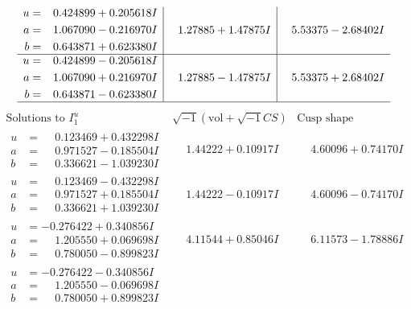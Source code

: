 \documentclass[1p]{elsarticle_modified}
\theoremstyle{definition}
\newcommand{\I}{\sqrt{-1}}
\begin{document}
$$\begin{array}{c|c|c}
\begin{aligned}
u &= \phantom{-}0.424899 + 0.205618 I \\
a &= \phantom{-}1.067090 - 0.216970 I \\
b &= \phantom{-}0.643871 + 0.623380 I\end{aligned}
 & \phantom{-}1.27885 + 1.47875 I & \phantom{-}5.53375 - 2.68402 I \\ \hline\begin{aligned}
u &= \phantom{-}0.424899 - 0.205618 I \\
a &= \phantom{-}1.067090 + 0.216970 I \\
b &= \phantom{-}0.643871 - 0.623380 I\end{aligned}
 & \phantom{-}1.27885 - 1.47875 I & \phantom{-}5.53375 + 2.68402 I\\
 \hline 
 \end{array}$$\newpage$$\begin{array}{c|c|c}  
\text{Solutions to }I^u_{1}& \I (\text{vol} + \sqrt{-1}CS) & \text{Cusp shape}\\
 \hline 
\begin{aligned}
u &= \phantom{-}0.123469 + 0.432298 I \\
a &= \phantom{-}0.971527 - 0.185504 I \\
b &= \phantom{-}0.336621 - 1.039230 I\end{aligned}
 & \phantom{-}1.44222 + 0.10917 I & \phantom{-}4.60096 + 0.74170 I \\ \hline\begin{aligned}
u &= \phantom{-}0.123469 - 0.432298 I \\
a &= \phantom{-}0.971527 + 0.185504 I \\
b &= \phantom{-}0.336621 + 1.039230 I\end{aligned}
 & \phantom{-}1.44222 - 0.10917 I & \phantom{-}4.60096 - 0.74170 I \\ \hline\begin{aligned}
u &= -0.276422 + 0.340856 I \\
a &= \phantom{-}1.205550 + 0.069698 I \\
b &= \phantom{-}0.780050 - 0.899823 I\end{aligned}
 & \phantom{-}4.11544 + 0.85046 I & \phantom{-}6.11573 - 1.78886 I \\ \hline\begin{aligned}
u &= -0.276422 - 0.340856 I \\
a &= \phantom{-}1.205550 - 0.069698 I \\
b &= \phantom{-}0.780050 + 0.899823 I\end{aligned}

\end{array}$$
\end{document}
